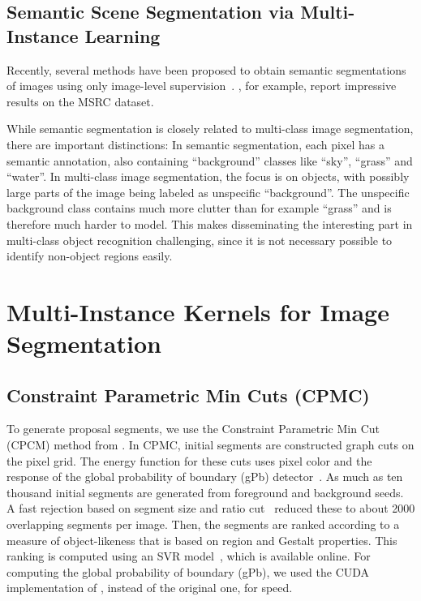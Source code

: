 

\subsection{Semantic Scene Segmentation via Multi-Instance Learning}
Recently, several methods have been proposed to obtain semantic segmentations of images using only
image-level supervision~\citep{vezhnevets2011weakly,verbeek2007region,vezhnevets2010towards}. \citet{vezhnevets2011weakly},
for example, report impressive results on the MSRC dataset.

While semantic segmentation is closely related to multi-class image segmentation, there are important
distinctions: In semantic segmentation, each pixel has a semantic annotation, also containing ``background''
classes like ``sky'', ``grass'' and ``water''. In multi-class image segmentation, the focus is on
objects, with possibly large parts of the image being labeled as unspecific ``background''.
The unspecific background class contains much more clutter than for example ``grass'' and is therefore
much harder to model.
This makes disseminating the interesting part in multi-class object recognition challenging, since it
is not necessary possible to identify non-object regions easily.


\section{Multi-Instance Kernels for Image Segmentation}
\subsection{Constraint Parametric Min Cuts (CPMC)}
To generate proposal segments, we use the Constraint Parametric Min Cut (CPCM) method from \citet{carreira2010constrained}. In CPMC, initial
segments are constructed graph cuts on the pixel grid. The energy function for these cuts uses pixel
color and the response of the global probability of boundary (gPb) detector~\citep{maire2008using}. As much as ten thousand initial segments are generated from foreground
and background seeds. A fast rejection based on segment size and ratio cut~\citep{wang2003image} reduced these to about 2000 overlapping
segments per image. Then, the segments are ranked according to a measure of object-likeness that is based on region and Gestalt properties.
This ranking is computed using an SVR model~\citep{carreira2010constrained}, which is available online.
For computing the global probability of boundary (gPb), we used the CUDA implementation
of \citet{catanzaro2009efficient}, instead of the original one, for speed.

